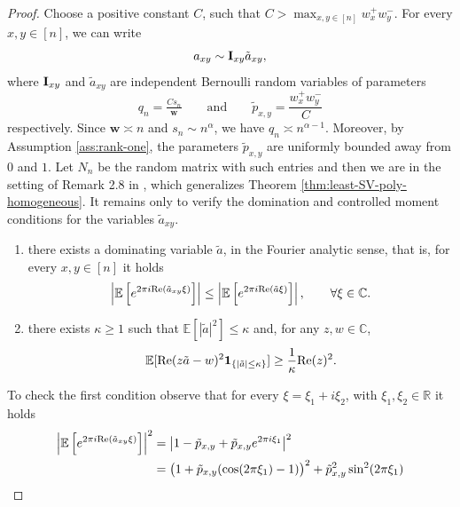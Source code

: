 \documentclass[11pt,oneside]{amsart}
\theoremstyle{plain}
\numberwithin{equation}{section}
\newcommand{\red}{\color{red}}
\newcommand{\R}{\mathbb{R}}
\newcommand{\E}{\mathbb{E}}
\newcommand{\one}{\textup{\textbf{1}}}
\newcommand{\w}{\boldsymbol{w}}
\newcommand{\scaling}{s_n}
\begin{document}
\begin{proof}
    Choose a positive constant $C$, such that $C> \max_{x,y \in [n]} w_x^+w_y^-$. For every $x,y \in [n]$, we can write
    \begin{equation}
        a_{xy} \sim {\rm \bf I}_{xy} \tilde a_{xy}, 
    \end{equation}
    where ${\rm \bf I}_{xy}$ and $\tilde a_{xy}$ are independent Bernoulli random variables of parameters $$q_n=\tfrac{C\scaling}{\w} \qquad{\text{and}}\qquad \tilde p_{x,y}=\frac{w_x^+w_y^-}{C}$$
    respectively. Since $\w\asymp n$ and $\scaling \sim n^\alpha$, we have $q_n\asymp n^{\alpha-1}$. Moreover, by Assumption \ref{ass:rank-one}, the parameters $\tilde p_{x,y}$ are uniformly bounded away from $0$ and $1$. Let $N_{n}$ be the random matrix with such entries and then we are in the setting of Remark 2.8 in \cite{TV}, which generalizes Theorem \ref{thm:least-SV-poly-homogeneous}. It remains only to verify the domination and controlled moment conditions for the variables $\tilde a_{xy}$.
    \begin{enumerate}
        \item[(i)] there exists a dominating variable $\tilde a$, in the Fourier analytic sense, that is, for every $x,y \in [n]$ it holds 
        \begin{equation}
            \left|\E\left[e^{2\pi i {\rm Re}(\tilde a_{xy}\xi) }\right]\right| \le  \left|\E\left[e^{2\pi i  {\rm Re}(\tilde a\xi) }\right]\right| , \qquad \forall \xi \in \mathbb{C}.
        \end{equation}
        \item[(ii)] there exists $\kappa \ge 1$ such that $\E[|\tilde a|^2] \le \kappa$ and, for any $z , w \in \mathbb{C}$,
        \begin{equation}
        \E[{\rm Re}(z\tilde a-w)^2 \one_{\{|\tilde a |\le \kappa\}}]\ge \frac{1}{\kappa} {\rm Re}(z)^2.
        \end{equation}
    \end{enumerate}
    To check the first condition observe that for every $\xi = \xi_1+i\xi_2$, with $\xi_1,\xi_2\in \R$ it holds
    \begin{equation}
    \begin{split}
        \left|\E\left[e^{2\pi i {\rm Re}(\tilde a_{xy}\xi) }\right]\right|^2 
        & = \big|1-\tilde p_{x,y}+\tilde p_{x,y}e^{2\pi i \xi_1 }\big|^2 \\
        & = \big(1+\tilde p_{x,y}(\cos(2\pi  \xi_1)-1)\big)^2+\tilde p_{x,y}^2\sin^2(2\pi  \xi_1)\\

\end{split}
\end{equation}
\end{proof}
\end{document}
